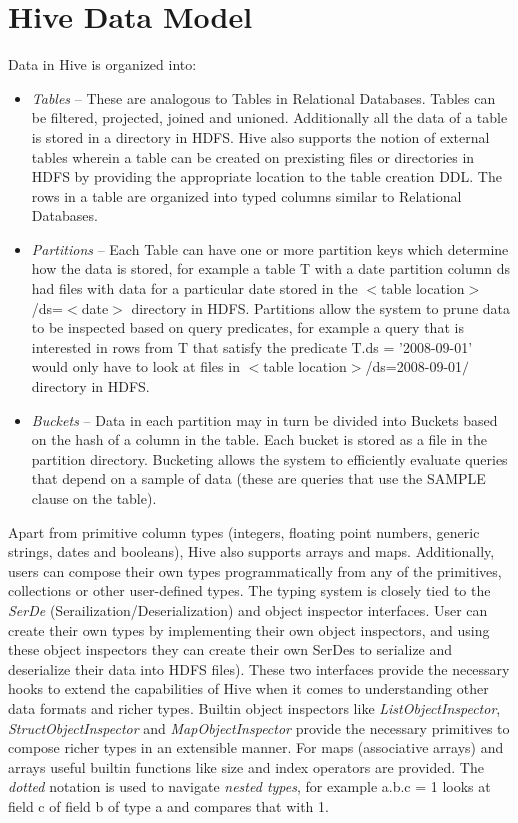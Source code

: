 \documentclass[twocolumn]{article}
\newcommand{\bi}{\begin{itemize}}
\newcommand{\ei}{\end{itemize}}
\newcommand{\ii}{\item}
\begin{document}
\section{Hive Data Model}
Data in Hive is organized into:
\bi
\ii \textit{Tables} – These are analogous to Tables in Relational Databases. Tables can be filtered, projected, joined and unioned. Additionally all the data of a table is stored in a directory in HDFS. Hive also supports the notion of external tables wherein a table can be created on prexisting files or directories in HDFS by providing the appropriate location to the table creation DDL. The rows in a table are organized into typed columns similar to Relational Databases.
\ii \textit{Partitions} – Each Table can have one or more partition keys which determine how the data is stored, for example a table T with a date partition column ds had files with data for a particular date stored in the $<$table location$>$/ds=$<$date$>$ directory in HDFS. Partitions allow the system to prune data to be inspected based on query predicates, for example a query that is interested in rows from T that satisfy the predicate T.ds = '2008-09-01' would only have to look at files in $<$table location$>$/ds=2008-09-01$/$ directory in HDFS.
\ii \textit{Buckets} – Data in each partition may in turn be divided into Buckets based on the hash of a column in the table. Each bucket is stored as a file in the partition directory. Bucketing allows the system to efficiently evaluate queries that depend on a sample of data (these are queries that use the SAMPLE clause on the table).
\ei

Apart from primitive column types (integers, floating point numbers, generic strings, dates and booleans), Hive also supports arrays and maps. Additionally, users can compose their own types programmatically from any of the primitives, collections or other user-defined types. 
The typing system is closely tied to the \textit{SerDe} (Serailization/Deserialization) and object inspector interfaces. User can create their own types by implementing their own object inspectors, and using these object inspectors they can create their own SerDes to serialize and deserialize their data into HDFS files). 
These two interfaces provide the necessary hooks to extend the capabilities of Hive when it comes to understanding other data formats and richer types. Builtin object inspectors like \textit{ListObjectInspector}, \textit{StructObjectInspector} and \textit{MapObjectInspector} provide the necessary primitives to compose richer types in an extensible manner. 
For maps (associative arrays) and arrays useful builtin functions like size and index operators are provided. The \textit{dotted} notation is used to navigate \textit{nested types}, for example a.b.c = 1 looks at field c of field b of type a and compares that with 1.
\end{document}
